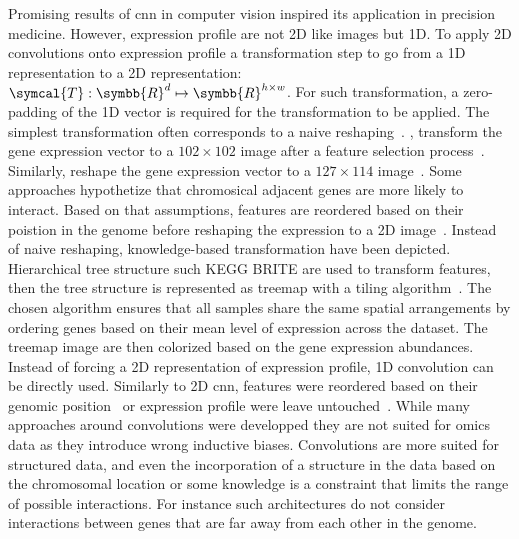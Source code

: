 \documentclass[../main.tex]{subfiles}
\begin{document}
	Promising results of \gls{cnn} in computer vision inspired its application in precision medicine.
	However, expression profile are not 2D like images but 1D.
	To apply 2D convolutions onto expression profile a transformation step to go from a 1D representation to a 2D representation: \(\symcal{T}: \symbb{R}^{d} \mapsto \symbb{R}^{h\times w}\).
	For such transformation, a zero-padding of the 1D vector is required for the transformation to be applied.
	The simplest transformation often corresponds to a naive reshaping~\cite{Wang2021,deGuia2019,Elbashir2019,Chatterjee2018}\@. \citeauthor{deGuia2019}, transform the gene expression vector to a \(102\times 102\) image after a feature selection process~\cite{deGuia2019}.
	Similarly, \citeauthor{Elbashir2019} reshape the gene expression vector to a \(127 \times 114\) image~\cite{Elbashir2019}.
	Some approaches hypothetize that chromosical adjacent genes are more likely to interact.
	Based on that assumptions, features are reordered based on their poistion in the genome before reshaping the expression to a 2D image~\cite{Mostavi2020,Lyu2018,Yin2022}.
	Instead of naive reshaping, knowledge-based transformation have been depicted.
	Hierarchical tree structure such KEGG BRITE are used to transform features, then the tree structure is represented as treemap with a tiling algorithm~\cite{LpezGarca2020,maOmicsMapNetTransformingOmics2019}.
	The chosen algorithm ensures that all samples share the same spatial arrangements by ordering genes based on their mean level of expression across the dataset.
	The treemap image are then colorized based on the gene expression abundances.
	Instead of forcing a 2D representation of expression profile, 1D convolution can be directly used.
	Similarly to 2D \gls{cnn}, features were reordered based on their genomic position~\cite{Mostavi2020,Zhao2020,Yin2022} or expression profile were leave untouched~\cite{Mohammed2021}.
	While many approaches around convolutions were developped they are not suited for omics data as they introduce wrong inductive biases.
	Convolutions are more suited for structured data, and even the incorporation of a structure in the data based on the chromosomal location or some knowledge is a constraint that limits the range of possible interactions.
	For instance such architectures do not consider interactions between genes that are far away from each other in the genome.
\end{document}
